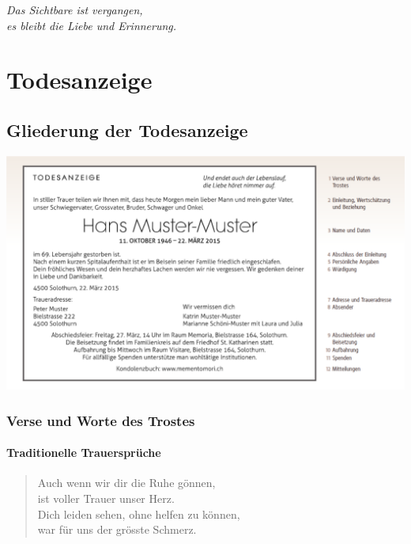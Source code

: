 \documentclass[ngerman,a4paper,11pt]{scrreprt}
\begin{document}
\newpage
\clearpage
\pagestyle{empty}
\vspace*{6cm}
\begin{flushright}
\Huge{\textit{Das Sichtbare ist vergangen,\\
es bleibt die Liebe und Erinnerung.}}
\end{flushright}

\clearpage
\pagestyle{plain}

\tableofcontents

\part{Todesanzeige}
\label{sec-1}

\chapter{Gliederung der Todesanzeige}
\label{sec-1-1}

\includegraphics[width=\textwidth]{Bilder/MusterTodesanzeige.png}

\clearpage

\section{Verse und Worte des Trostes}
\label{sec-1-1-1}

\subsection{Traditionelle Trauersprüche}
\label{sec-1-1-1-1}

\begin{verse}
Auch wenn wir dir die Ruhe gönnen, \\
ist voller Trauer unser Herz. \\
Dich leiden sehen, ohne helfen zu können, \\
war für uns der grösste Schmerz. \\
\end{verse}
\end{document}
